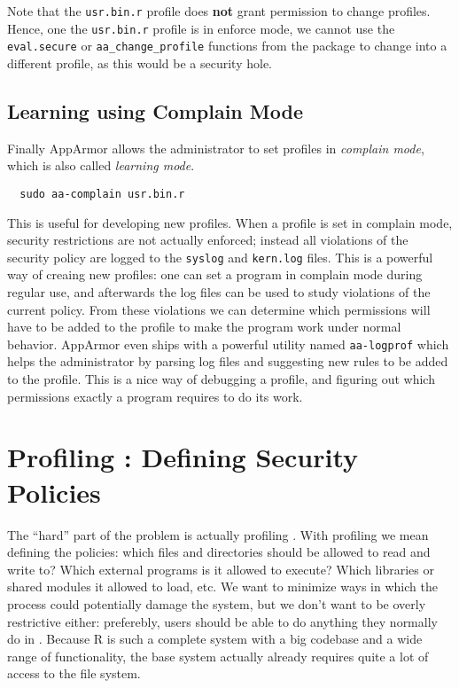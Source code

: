 \documentclass[article]{jss}
\begin{document}
Note that the \texttt{usr.bin.r} profile does \textbf{not} grant permission to
change profiles. Hence, one the \texttt{usr.bin.r} profile is in enforce mode,
we cannot use the \texttt{eval.secure} or \texttt{aa\_change\_profile} functions
from the  package to change into a different profile, as this
would be a security hole.

\subsection{Learning using Complain Mode}

Finally AppArmor allows the administrator to set profiles in \emph{complain
mode}, which is also called \emph{learning mode}. 
\begin{verbatim}
  sudo aa-complain usr.bin.r
\end{verbatim}
This is useful for developing new profiles. When a profile is set in complain
mode, security restrictions are not actually enforced; instead all violations
of the security policy are logged to the \texttt{syslog} and \texttt{kern.log}
files. This is a powerful way of creaing new profiles: one can set a program in
complain mode during regular use, and afterwards the log files can be used to
study violations of the current policy. From these violations we can determine
which permissions will have to be added to the profile to make the program work
under normal behavior. AppArmor even ships with a powerful utility named
\texttt{aa-logprof} which helps the administrator by parsing log files and
suggesting new rules to be added to the profile. This is a nice way of
debugging a profile, and figuring out which permissions exactly a program
requires to do its work.

\section[Profiling R]{Profiling : Defining Security Policies}

The ``hard'' part of the problem is actually profiling . With
profiling we mean defining the policies: which files and directories should
 be allowed to read and write to? Which external programs is it
allowed to execute? Which libraries or shared modules it allowed to load, etc.
We want to minimize ways in which the process could potentially damage the
system, but we don't want to be overly restrictive either: preferebly, users
should be able to do anything they normally do in . Because R is
such a complete system with a big codebase and a wide range of functionality,
the base system actually already requires quite a lot of access to the file
system.
\end{document}
